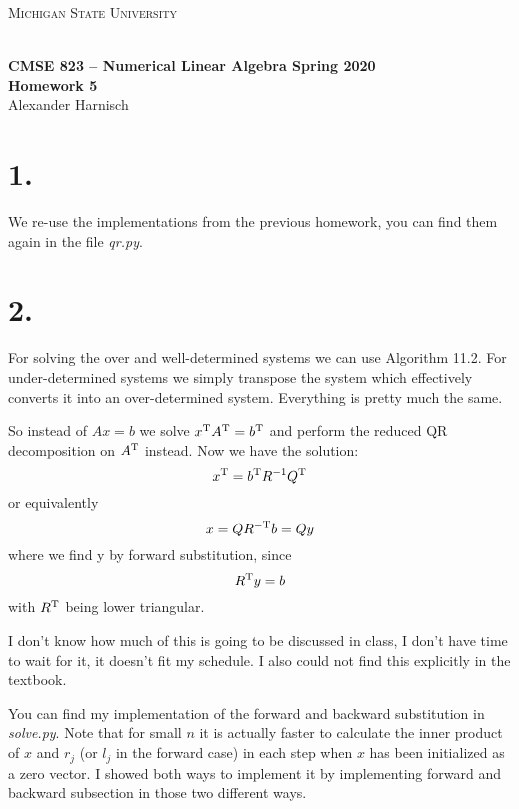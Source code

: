 \documentclass[a4paper, 11pt]{article}
\begin{document}
\noindent
\centerline{\small{\textsc{Michigan State University}}} \\
\large{\textbf{CMSE 823 – Numerical Linear Algebra \hfill Spring 2020 \\
Homework 5}} \\
Alexander Harnisch \\
\noindent\makebox[\linewidth]{\rule{\textwidth}{0.4pt}}

\section*{1.}
We re-use the implementations from the previous homework, you can find them
again in the file \textit{qr.py}.

\section*{2.}
For solving the over and well-determined systems we can use Algorithm 11.2. For
under-determined systems we simply transpose the system which effectively
converts it into an over-determined system. Everything is pretty much the same.

So instead of $Ax=b$ we solve $x^\textup{T}A^\textup{T}=b^\textup{T}$ and
perform the reduced QR decomposition on $A^\textup{T}$ instead. Now we have the solution:
\begin{equation}
  x^\textup{T} = b^\textup{T}R^{-1}Q^{\textup{T}}
\end{equation}
or equivalently
\begin{equation}
  x = QR^{-\textup{T}}b = Qy
\end{equation}
where we find y by forward substitution, since 
\begin{equation}
  R^\textup{T}y = b
\end{equation}
with $R^\textup{T}$ being lower triangular.

I don't know how much of this is going to be discussed in class, I don't have
time to wait for it, it doesn't fit my schedule. I also could not find this
explicitly in the textbook.

You can find my implementation of the forward and backward substitution in
\textit{solve.py}. Note that for small $n$ it is actually faster to calculate
the inner product of $x$ and $r_j$ (or $l_j$ in the forward case) in each step
when $x$ has been initialized as a zero vector. I showed both ways to implement
it by implementing forward and backward subsection in those two different ways.
\end{document}
